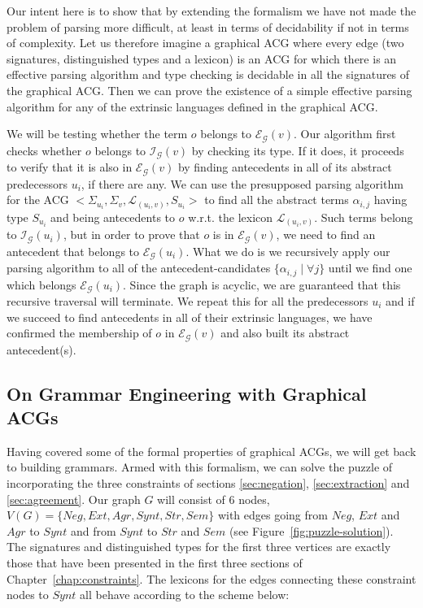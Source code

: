 Our intent here is to show that by extending the formalism we have not
made the problem of parsing more difficult, at least in terms of
decidability if not in terms of complexity. Let us therefore imagine a
graphical ACG where every edge (two signatures, distinguished types and
a lexicon) is an ACG for which there is an effective parsing algorithm
and type checking is decidable in all the signatures of the graphical
ACG. Then we can prove the existence of a simple effective parsing
algorithm for any of the extrinsic languages defined in the graphical
ACG.

We will be testing whether the term $o$ belongs to
$\mathcal{E}_{\mathcal{G}}(v)$. Our algorithm first checks whether $o$
belongs to $\mathcal{I}_{\mathcal{G}}(v)$ by checking its type. If it
does, it proceeds to verify that it is also in
$\mathcal{E}_{\mathcal{G}}(v)$ by finding antecedents in all of its
abstract predecessors $u_i$, if there are any. We can use the
presupposed parsing algorithm for the ACG $\mathopen{<} \Sigma_{u_i},
\Sigma_v, \mathcal{L}_{(u_i,v)}, S_{u_i}\mathclose{>}$ to find all the
abstract terms $\alpha_{i,j}$ having type $S_{u_i}$ and being
antecedents to $o$ w.r.t. the lexicon $\mathcal{L}_{(u_i,v)}$. Such
terms belong to $\mathcal{I}_{\mathcal{G}}(u_i)$, but in order to prove
that $o$ is in $\mathcal{E}_{\mathcal{G}}(v)$, we need to find an
antecedent that belongs to $\mathcal{E}_{\mathcal{G}}(u_i)$. What we do
is we recursively apply our parsing algorithm to all of the
antecedent-candidates $\{\alpha_{i,j} \mid \forall j\}$ until we find
one which belongs $\mathcal{E}_{\mathcal{G}}(u_i)$. Since the graph is
acyclic, we are guaranteed that this recursive traversal will
terminate. We repeat this for all the predecessors $u_i$ and if we
succeed to find antecedents in all of their extrinsic languages, we have
confirmed the membership of $o$ in $\mathcal{E}_{\mathcal{G}}(v)$ and
also built its abstract antecedent(s).


\subsection{On Grammar Engineering with Graphical ACGs}
\label{ssec:graphical-engineering}

Having covered some of the formal properties of graphical ACGs, we will
get back to building grammars. Armed with this formalism, we can solve
the puzzle of incorporating the three constraints of sections
\ref{sec:negation}, \ref{sec:extraction} and \ref{sec:agreement}. Our
graph $G$ will consist of 6 nodes, $V(G) = \{Neg, Ext, Agr, Synt, Str,
Sem\}$ with edges going from $Neg$, $Ext$ and $Agr$ to $Synt$ and from
$Synt$ to $Str$ and $Sem$ (see Figure~\ref{fig:puzzle-solution}). The
signatures and distinguished types for the first three vertices are
exactly those that have been presented in the first three sections of
Chapter~\ref{chap:constraints}. The lexicons for the edges connecting
these constraint nodes to $Synt$ all behave according to the scheme
below:


